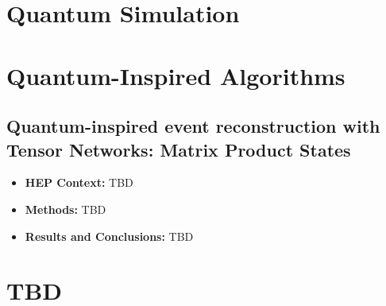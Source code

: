 \section{Quantum Simulation}



\section{Quantum-Inspired Algorithms}

\subsection{Quantum-inspired event reconstruction with Tensor Networks: Matrix Product States~\cite{Araz:2021zwu}}
\begin{itemize}
	\item \textbf{HEP Context: }TBD
	\item \textbf{Methods: }TBD
	\item \textbf{Results and Conclusions: }TBD
\end{itemize}

\section{TBD}


